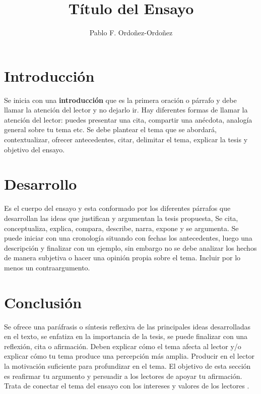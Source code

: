 \documentclass[a4paper,12pt]{article}
\title{Título del Ensayo}
\author[1]{
  Pablo F. Ordoñez-Ordoñez \orcid{0000-0001-8079-7694} 
}
\affil[1]{Universidad Nacional de Loja, Ecuador, Facultad de Energía, CIS, Análisis y Diseño de Sistemas, profesor \href{mailto:pfordonez@unl.edu.ec}{pfordonez@unl.edu.ec}}
\begin{document}
\maketitle

\section{Introducción}

Se inicia con una \textbf{introducción}  que es la primera oración o párrafo  y debe llamar la atención del lector y no dejarlo ir. Hay diferentes formas de llamar la atención del lector: puedes presentar una cita,  compartir una anécdota, analogía general sobre tu tema etc. Se debe plantear el tema que se abordará, contextualizar, ofrecer antecedentes, citar, delimitar el tema, explicar la tesis y objetivo del ensayo.

\section{Desarrollo}
Es el cuerpo del ensayo y esta conformado por los diferentes párrafos que desarrollan las ideas que justifican y argumentan la tesis propuesta, Se cita, conceptualiza, explica, compara, describe, narra, expone y se argumenta. Se puede iniciar con una cronología situando con fechas los antecedentes, luego una descripción y finalizar con un ejemplo, sin embargo no se debe analizar los hechos de manera subjetiva o hacer una opinión propia sobre el tema. Incluir por lo menos un contraargumento. 

\section{Conclusión}
Se ofrece una paráfrasis o síntesis reflexiva de las principales ideas desarrolladas en el texto, se enfatiza en la importancia de la tesis, se puede finalizar con una reflexión, cita o afirmación. Deben explicar cómo el tema afecta al lector y/o explicar cómo tu tema produce una percepción más amplia. Producir en el lector la motivación suficiente para profundizar en el tema. El objetivo de esta sección es reafirmar tu argumento y persuadir a los lectores de apoyar tu afirmación. Trata de conectar el tema del ensayo con los intereses y valores de los lectores\cite{youArg} \cite{web1}.


\medskip


\end{document}
